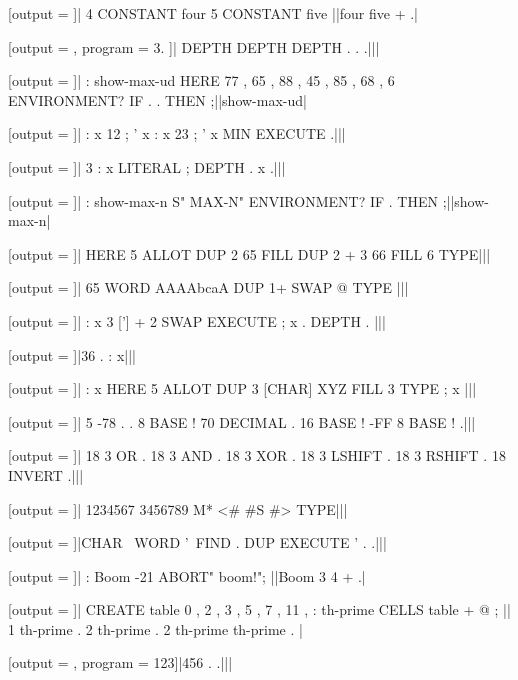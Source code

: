 [output = \result]|
  4 CONSTANT four
  5 CONSTANT five
||four five + .|
\typeout{\result}

[output = \result, program = { 3\space . }]|
  DEPTH DEPTH DEPTH . . .|||
\typeout{\result}

[output = \result]|
  : show-max-ud HERE 77 , 65 , 88 , 45 , 85 , 68 ,
    6 ENVIRONMENT? IF . . THEN ;||show-max-ud|
\typeout{\result}

[output = \result]|
  : x 12 ; ' x
  : x 23 ; ' x
  MIN EXECUTE .|||
\typeout{\result}

[output = \result]|
  3 : x LITERAL ; DEPTH . x .|||
\typeout{\result}

[output = \result]|
  : show-max-n S" MAX-N" ENVIRONMENT? IF . THEN ;||show-max-n|
\typeout{\result}

[output = \result]|
  HERE 5 ALLOT
  DUP 2 65 FILL
  DUP 2 + 3 66 FILL
  6 TYPE|||
\typeout{\result}

[output = \result]|
  65 WORD AAAAbcaA DUP 1+ SWAP @ TYPE
|||
\typeout{\result}

[output = \result]|
  : x 3 ['] + 2 SWAP EXECUTE ; x . DEPTH .
|||
\typeout{\result}

[output = \result]|36 . : x|||
\typeout{\result}

[output = \result]|
  : x HERE 5 ALLOT DUP 3 [CHAR] XYZ FILL 3 TYPE ; x |||
\typeout{\result}

[output = \result]|
  5 -78 . .
  8 BASE ! 70 DECIMAL .
  16 BASE ! -FF 8 BASE ! .|||
\typeout{\result}

[output = \result]|
  18 3 OR .
  18 3 AND .
  18 3 XOR .
  18 3 LSHIFT .
  18 3 RSHIFT .
  18 INVERT .|||
\typeout{\result}

[output = \result]|
  1234567 3456789 M* <# #S #> TYPE|||
\typeout{\result}

[output = \result]|CHAR \ WORD '\ FIND . DUP EXECUTE ' . .|||
\typeout{\result}

[output = \result]|
  : Boom -21 ABORT" boom!";
||Boom 3 4 + .|
\typeout{\result}

[output = \result]|
  CREATE table 0 , 2 , 3 , 5 , 7 , 11 ,
  : th-prime CELLS table + @ ;
||
  1 th-prime .
  2 th-prime .
  2 th-prime th-prime .
|
\typeout{\result}

[output = \result, program = {123}]|456 . .|||
\typeout{\result}


